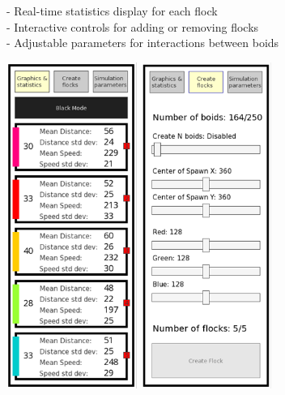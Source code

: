 \documentclass[10pt,a4paper]{article}
\begin{document}

- Real-time statistics display for each flock \\
- Interactive controls for adding or removing flocks \\
- Adjustable parameters for interactions between boids \\

\begin{center}
    \includegraphics[width=0.32\textwidth]{../images/option1.png}
    \includegraphics[width=0.32\textwidth]{../images/option2.png}

\end{center}
\end{document}
